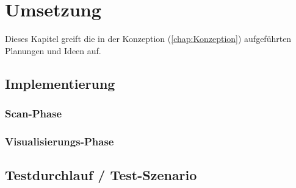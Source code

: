 

\chapter{Umsetzung}
\label{chap:Umsetzung}
Dieses Kapitel greift die in der Konzeption (\ref{chap:Konzeption}) aufgeführten Planungen und Ideen auf. 

\section{Implementierung}
\label{chap:implementierung}

\subsection{Scan-Phase} %
\subsection{Visualisierungs-Phase} 

\section{Testdurchlauf / Test-Szenario}
\label{chap:testdurchlauf}